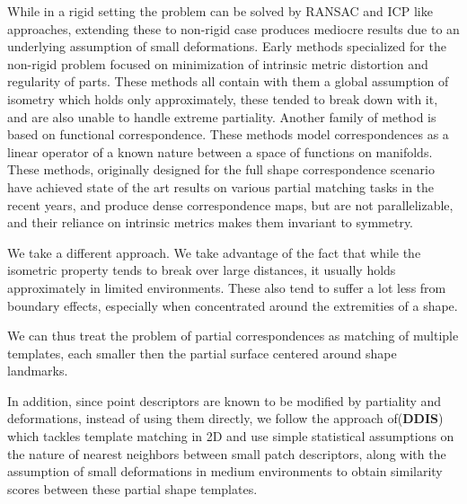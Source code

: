 \documentclass[10pt,twocolumn,letterpaper]{article}
\begin{document}
While in a rigid setting the problem can be solved by RANSAC and ICP like approaches\cite{rusu2009fast, holz2015registration}, extending these to non-rigid case produces mediocre results due to an underlying assumption of small deformations. 
Early methods specialized for the non-rigid problem focused on minimization of intrinsic metric distortion\cite{bronstein2006generalized,Torsello:2012:GAD:2354409.2354702,Rodola:2013:ENC:2586117.2587323} and regularity of parts\cite{Bronstein:2009:PSO:1553357.1553368,bronstein2008not}. These methods all contain with them a global assumption of isometry which holds only approximately, these tended to break down with it, and are also unable to handle extreme partiality. 
Another family of method is based on functional correspondence. These methods model correspondences as a linear operator of a known nature between a space of functions on manifolds\cite{Ovsjanikov:2012:FMF:2185520.2185526}. These methods, originally designed for the full shape correspondence scenario have achieved state of the art results on various partial matching tasks in the recent years\cite{litany2017fully,vestner2017efficient,rodola2017partial}, and produce dense correspondence maps, but are not parallelizable, and their reliance on intrinsic metrics makes them invariant to symmetry. 

We take a different approach. We take advantage of the fact that while the isometric property tends to break over large distances, it usually holds approximately in limited environments. These also tend to suffer a lot less from boundary effects, especially when concentrated around the extremities of a shape. 

We can thus treat the problem of partial correspondences as matching of multiple templates, each smaller then the partial surface centered around shape landmarks. 

In addition, since point descriptors are known to be modified by partiality and deformations, instead of using them directly, we follow the approach of\cite{talmi2017template}(\textbf{DDIS}) which tackles template matching in 2D and use simple statistical assumptions on the nature of nearest neighbors between small patch descriptors, along with the assumption of small deformations in medium environments to obtain similarity scores between these partial shape templates.
\end{document}
